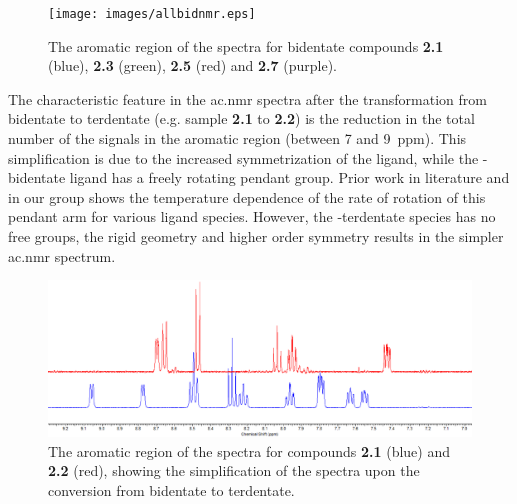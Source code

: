 \begin{figure}[!htb]
 \begin{center}
  \texttt{[image: images/allbidnmr.eps]}
 \end{center}
\caption[The aromatic region of the \texorpdfstring{}{1H}  spectra of the four bidentate compounds.]{The aromatic region of the \texorpdfstring{}{1H}  spectra for bidentate compounds \textbf{2.1} (blue), \textbf{2.3} (green), \textbf{2.5} (red) and \textbf{2.7} (purple).}
\label{fig.bid4nmr}
\end{figure} 

The characteristic feature in the \gls{ac.nmr} spectra after the transformation from bidentate to terdentate (e.g. sample \textbf{2.1} to \textbf{2.2}) is the reduction in the total number of the signals in the aromatic region (between 7 and 9~ppm). This simplification is due to the increased symmetrization of the ligand, while the -bidentate ligand has a freely rotating pendant group. Prior work in literature\autocite{abel1993} and in our group\autocite{jurca2012} shows the temperature dependence of the rate of rotation of this pendant arm for various ligand species. However, the -terdentate species has no free groups, the rigid geometry and higher order symmetry results in the simpler \gls{ac.nmr} spectrum.

\begin{figure}[!htb]
 \begin{center}
  \includegraphics[clip=true, width=\textwidth, keepaspectratio]{images/bidternmr.eps}
 \end{center}
\caption[The aromatic region of the \texorpdfstring{}{1H}  spectra showing bidentate - terdentate conversion.]{The aromatic region of the \texorpdfstring{}{1H}  spectra for compounds \textbf{2.1} (blue) and \textbf{2.2} (red), showing the simplification of the spectra upon the conversion from bidentate to terdentate.}
\label{fig.bidtoter}
\end{figure} 

